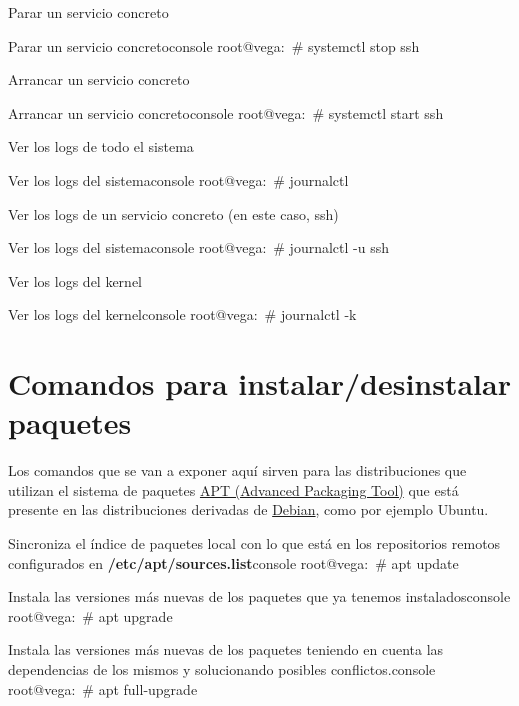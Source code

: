 Parar un servicio concreto
\begin{mycode}{Parar un servicio concreto}{console}{}
root@vega:~# systemctl stop ssh
\end{mycode}

Arrancar un servicio concreto
\begin{mycode}{Arrancar un servicio concreto}{console}{}
root@vega:~# systemctl start ssh
\end{mycode}

Ver los logs de todo el sistema
\begin{mycode}{Ver los logs del sistema}{console}{}
root@vega:~# journalctl
\end{mycode}

Ver los logs de un servicio concreto (en este caso, ssh)
\begin{mycode}{Ver los logs del sistema}{console}{}
root@vega:~# journalctl -u ssh
\end{mycode}

Ver los logs del kernel
\begin{mycode}{Ver los logs del kernel}{console}{}
root@vega:~# journalctl -k
\end{mycode}


\section{Comandos para instalar/desinstalar paquetes}

Los comandos que se van a exponer aquí sirven para las distribuciones que utilizan el sistema de paquetes \href{https://es.wikipedia.org/wiki/Advanced_Packaging_Tool}{APT (Advanced Packaging Tool)} que está presente en las distribuciones derivadas de \href{https://www.debian.org/}{Debian}, como por ejemplo Ubuntu.


\begin{mycode}{Sincroniza el índice de paquetes local con lo que está en los repositorios remotos configurados en \textbf{/etc/apt/sources.list}}{console}{}
root@vega:~# apt update
\end{mycode}

\begin{mycode}{Instala las versiones más nuevas de los paquetes que ya tenemos instalados}{console}{}
root@vega:~# apt upgrade
\end{mycode}


\begin{mycode}{Instala las versiones más nuevas de los paquetes  teniendo en cuenta las dependencias de los mismos y solucionando posibles conflictos.}{console}{}
root@vega:~# apt full-upgrade
\end{mycode}



